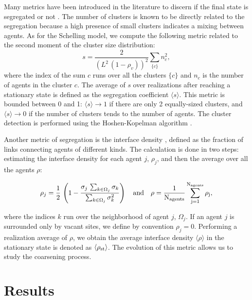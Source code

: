 Many metrics have been introduced in the literature to discern if the final state is segregated or not \cite{Gauvin_2009,lenormand-2015,randomwalks,urban}. The number of clusters is known to be directly related to the segregation because a high presence of small clusters indicates a mixing between agents. As for the Schelling model\cite{Gauvin_2009}, we compute the following metric related to the second moment of the cluster size distribution:
\begin{equation}
s = \frac{2}{\left(L^{2} \, (1-\rho_v)\right)^{2}} \sum_{\{c\}} n_{c}^{2} ,
\end{equation}
where the index of the sum $c$ runs over all the clusters $\{c\}$ and $n_c$ is the number of agents in the cluster $c$. The average of $s$ over realizations after reaching a stationary state is defined as the segregation coefficient $\langle s \rangle$. This metric is bounded between 0 and 1: $\langle s \rangle \to 1$ if there are only 2 equally-sized clusters, and $\langle s \rangle \to 0$ if the number of clusters tends to the number of agents. The cluster detection is performed using the Hoshen-Kopelman algorithm \cite{HoKo}.

Another metric of segregation is the interface density \cite{Dall_Asta_2008}, defined as the fraction of links connecting agents of different kinds. The calculation is done in two steps: estimating the interface density for each agent $j$, $\rho_j$, and then the average over all the agents $\rho$:

\begin{equation}
    \rho_j = \frac{1}{2} \, \left( 1 - \frac{\sigma_j \,  \sum_{k \in \Omega_j} \sigma_k}{\sum_{k \in \Omega_j} \sigma_k^2 } \right) \quad \rm{and} \quad \rho = \frac{1}{N_{\rm agents}} \sum_{j = 1}^{N_{\rm agents}} \rho_j ,
\end{equation}

where the indices $k$ run over the neighborhood of agent $j$, $\Omega_j$. If an agent $j$ is surrounded only by vacant sites, we define by convention $\rho_j = 0$. Performing a realization average of $\rho$, we obtain the average interface density $\langle \rho \rangle$ in the stationary state is denoted as $\langle\rho_{\rm{st}} \rangle$. The evolution of this metric allows us to study the coarsening process.

\section{Results} 

